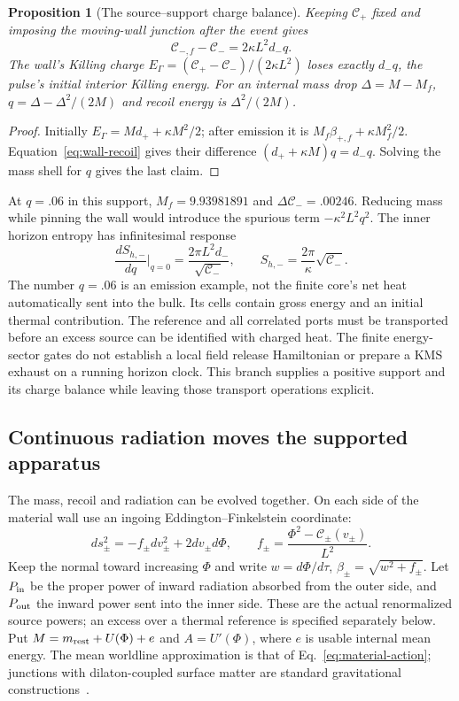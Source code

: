 \documentclass[12pt,a4paper]{article}
\newtheorem{proposition}[theorem]{Proposition}
\begin{document}
\begin{proposition}[The source--support charge balance]
\label{prop:wall-recoil}
Keeping $\mathcal C_+$ fixed and imposing the moving-wall junction after
the event gives
\begin{equation}\label{eq:wall-source-invariant}
 \mathcal C_{-,f}-\mathcal C_-=2\kappa L^2d_-q.
\end{equation}
The wall's Killing charge
$E_\Gamma=(\mathcal C_+-\mathcal C_-)/(2\kappa L^2)$ loses exactly
$d_-q$, the pulse's initial interior Killing energy.
For an internal mass drop $\Delta=M-M_f$,
$q=\Delta-\Delta^2/(2M)$ and recoil energy is $\Delta^2/(2M)$.
\end{proposition}
\begin{proof}
Initially $E_\Gamma=Md_++\kappa M^2/2$; after emission it is
$M_f\beta_{+,f}+\kappa M_f^2/2$.
Equation~\eqref{eq:wall-recoil} gives their difference
$(d_++\kappa M)q=d_-q$. Solving the mass shell for $q$ gives the last claim.
\end{proof}

At $q=.06$ in this support, $M_f=9.93981891$ and
$\Delta\mathcal C_-=.00246$. Reducing mass while pinning the wall
would introduce the spurious term $-\kappa^2L^2q^2$.
The inner horizon entropy has infinitesimal response
\[
 \frac{dS_{h,-}}{dq}\bigg|_{q=0}
       =\frac{2\pi L^2d_-}{\sqrt{\mathcal C_-}},\qquad
 S_{h,-}=\frac{2\pi}{\kappa}\sqrt{\mathcal C_-}.
\]
The number $q=.06$ is an emission example, not the finite core's net heat
automatically sent into the bulk. Its cells contain gross energy and an
initial thermal contribution. The reference and all correlated ports must
be transported before an excess source can be identified with charged heat.
The finite energy-sector gates do not establish a local field release
Hamiltonian or prepare a KMS exhaust on a running horizon clock.
This branch supplies a positive support and its charge balance while
leaving those transport operations explicit.

\subsection{Continuous radiation moves the supported apparatus}
\label{sec:radiating-support}

The mass, recoil and radiation can be evolved together. On each side of
the material wall use an ingoing Eddington--Finkelstein coordinate:
\[
 ds_\pm^2=-f_\pm dv_\pm^2+2dv_\pm d\Phi,\qquad
 f_\pm=\frac{\Phi^2-\mathcal C_\pm(v_\pm)}{L^2}.
\]
Keep the normal toward increasing $\Phi$ and write
$w=d\Phi/d\tau$, $\beta_\pm=\sqrt{w^2+f_\pm}$.
Let $P_{\rm in}$ be the proper power of inward radiation absorbed from
the outer side, and $P_{\rm out}$ the inward power sent into the inner
side. These are the actual renormalized source powers; an excess
over a thermal reference is specified separately below. Put
$M=m_{\rm rest}+U(\Phi)+e$ and $A=U'(\Phi)$, where $e$ is usable internal
mean energy. The mean worldline approximation is that of
Eq.~\eqref{eq:material-action}; junctions with dilaton-coupled surface
matter are standard gravitational constructions~\cite[Sec.~V]{Shen2024}.
\end{document}
